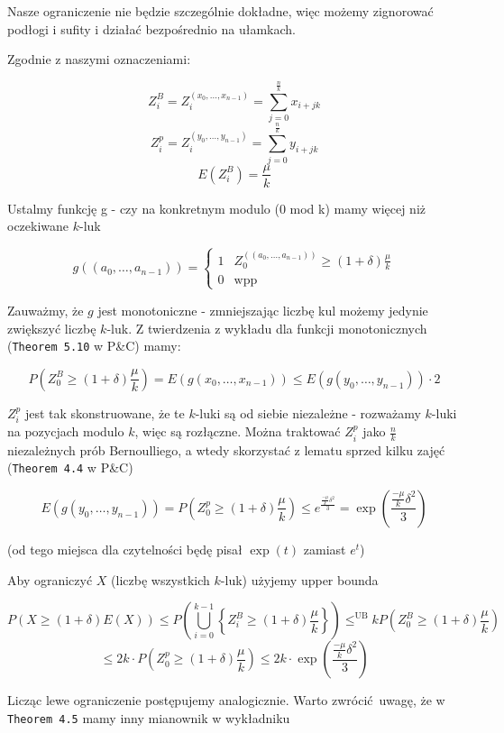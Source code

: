 Nasze ograniczenie nie będzie szczególnie dokładne, więc możemy zignorować
podłogi i sufity i działać bezpośrednio na ułamkach.

Zgodnie z naszymi oznaczeniami:

\[
	Z_i^B = Z_i^{(x_0, \ldots, x_{n-1})}
	= \sum_{j=0}^{\frac{n}{k}} x_{i+jk}
\]
\[
	Z_i^p = Z_i^{(y_0, \ldots, y_{n-1})}
	= \sum_{j=0}^{\frac{n}{k}} y_{i+jk}
\]
\[
	E(Z_i^B) = \frac{\mu}{k}
\]

Ustalmy funkcję g - czy na konkretnym modulo (0 mod k) mamy więcej niż oczekiwane
\(k\)-luk

\[
	g((a_0, \ldots, a_{n-1})) =
	\begin{cases}
		1 & Z_0^{((a_0, \ldots, a_{n-1}))} \geqslant (1+\delta)\frac{\mu}k \\
		0 & \text{wpp}
	\end{cases}
\]

Zauważmy, że \(g\) jest monotoniczne - zmniejszając liczbę kul możemy
jedynie zwiększyć liczbę \(k\)-luk. Z twierdzenia z wykładu dla funkcji
monotonicznych (\texttt{Theorem 5.10} w P\&C) mamy:

\[
	P\left(Z_0^{B} \geqslant (1+\delta)\frac{\mu}k\right)
	= E(g(x_0, \ldots, x_{n-1}))
	\leqslant E(g(y_0, \ldots, y_{n-1})) \cdot 2
\]

\(Z_i^{p}\) jest tak skonstruowane, że te \(k\)-luki
są od siebie niezależne
- rozważamy \(k\)-luki na pozycjach modulo \(k\), więc są rozłączne.
Można traktować \(Z_i^{p}\) jako \(\frac{n}k\) niezależnych
prób Bernoulliego, a wtedy skorzystać z lematu sprzed kilku zajęć
(\texttt{Theorem 4.4} w P\&C)

\[
	E(g(y_0, \ldots, y_{n-1}))
	= P\left(Z_0^{p} \geqslant (1+\delta)\frac{\mu}k\right)
	\leqslant e^{\frac{\frac{-\mu}{k}\delta^2}{3}}
	= \exp\left(\frac{\frac{-\mu}{k}\delta^2}{3}\right)
\]

(od tego miejsca dla czytelności będę pisał \(\exp(t)\) zamiast \(e^t\))

Aby ograniczyć \(X\) (liczbę wszystkich \(k\)-luk) użyjemy upper bounda

\[
	P(X \geqslant (1+\delta)E(X))
	\leqslant P\left(\bigcup_{i=0}^{k-1}
	\left\{Z_i^B \geqslant (1+\delta)\frac{\mu}k \right\}\right)
	\leqslant^{\text{UB}}
	k P\left(Z_0^{B} \geqslant (1+\delta)\frac{\mu}k\right)
\]
\[
	\leqslant 2k\cdot P\left(Z_0^{p} \geqslant (1+\delta)\frac{\mu}k\right)
	\leqslant 2k\cdot \exp\left(\frac{\frac{-\mu}{k}\delta^2}{3}\right)
\]

Licząc lewe ograniczenie postępujemy analogicznie. Warto zwrócić uwagę,
że w \texttt{Theorem 4.5} mamy inny mianownik w wykładniku


